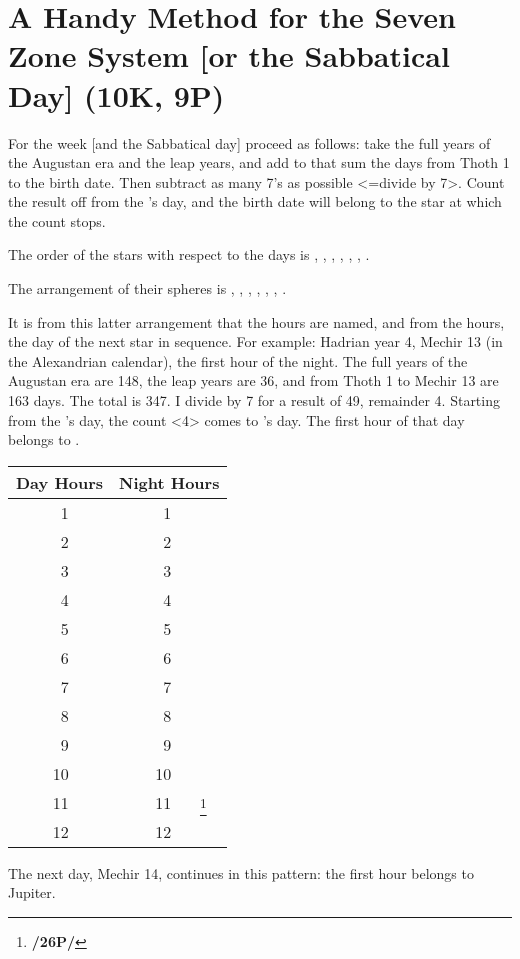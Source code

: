 \section{A Handy Method for the Seven Zone System [or the Sabbatical Day] (10K, 9P)}
For the week [and the Sabbatical day] proceed as follows: take the full years of the Augustan era and the leap years, and add to that sum the days from Thoth 1 to the birth date. Then subtract as many 7’s as possible <=divide by 7>. Count the result off from the \Sun’s day, and the birth date will belong to the star at which the count stops. 

The order of the stars with respect to the days is \Sun, \Moon, \Mars, \Mercury, \Jupiter, \Venus, \Saturn.

The arrangement of their spheres is \Saturn, \Jupiter, \Mars, \Sun, \Venus, \Mercury, \Moon.

\mnm[0.3cm]
It is from this latter arrangement that the hours are named, and from the hours, the day of the next star in sequence. For example: Hadrian year 4, Mechir 13 (in the Alexandrian calendar), the first hour of the night. The full years of the Augustan era are 148, the leap years are 36, and from Thoth 1 to Mechir 13 are 163 days. The total is 347. I divide by 7 for a result of 49, remainder 4. Starting from the \Sun’s day, the count <4>
comes to \Mercury’s day. The first hour of that day belongs to \Mercury.

\begin{longtable}[c]{|r|c|r|c|}
\hline
\multicolumn{2}{|c|}{Day Hours} & 
\multicolumn{2}{|c|}{Night Hours} \\
\hline
\endhead
1  & \Mercury	& 1  & \Sun		\\
2  & \Moon 		& 2  & \Venus	\\
3  & \Saturn 	& 3  & \Mercury	\\
4  & \Jupiter	& 4  & \Moon		\\
5  & \Mars		& 5  & \Saturn	\\
6  & \Sun			& 6  & \Jupiter	\\
7  & \Venus		& 7  & \Mars		\\
8  & \Mercury	& 8  & \Sun		\\
9  & \Moon		& 9  & \Venus	\\
10 & \Saturn		& 10 & \Mercury	\\
11 & \Jupiter	& 11 & \Moon\footnote{\textbf{/26P/}}	\\
12 & \Mars		& 12 & \Saturn	\\
\hline
\end{longtable}

The next day, Mechir 14, continues in this pattern: the first hour belongs to Jupiter.

\newpage